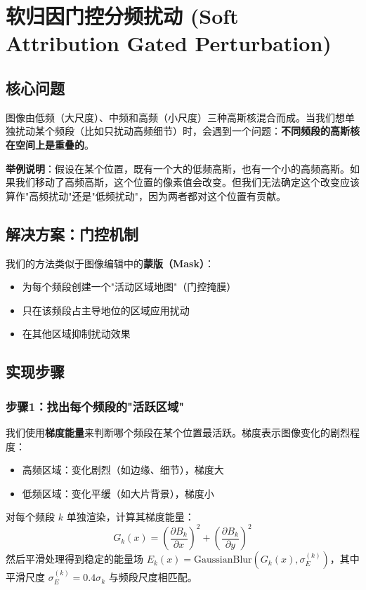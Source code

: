\documentclass{article}
\begin{document}
\section{软归因门控分频扰动 (Soft Attribution Gated Perturbation)}

\subsection{核心问题}
图像由低频（大尺度）、中频和高频（小尺度）三种高斯核混合而成。当我们想单独扰动某个频段（比如只扰动高频细节）时，会遇到一个问题：\textbf{不同频段的高斯核在空间上是重叠的}。

\textbf{举例说明}：假设在某个位置，既有一个大的低频高斯，也有一个小的高频高斯。如果我们移动了高频高斯，这个位置的像素值会改变。但我们无法确定这个改变应该算作"高频扰动"还是"低频扰动"，因为两者都对这个位置有贡献。

\subsection{解决方案：门控机制}
我们的方法类似于图像编辑中的\textbf{蒙版（Mask）}：
\begin{itemize}
    \item 为每个频段创建一个"活动区域地图"（门控掩膜）
    \item 只在该频段占主导地位的区域应用扰动
    \item 在其他区域抑制扰动效果
\end{itemize}

\subsection{实现步骤}

\subsubsection{步骤1：找出每个频段的"活跃区域"}
我们使用\textbf{梯度能量}来判断哪个频段在某个位置最活跃。梯度表示图像变化的剧烈程度：
\begin{itemize}
    \item 高频区域：变化剧烈（如边缘、细节），梯度大
    \item 低频区域：变化平缓（如大片背景），梯度小
\end{itemize}

对每个频段 $k$ 单独渲染，计算其梯度能量：
\begin{equation}
G_k(x) = \left(\frac{\partial B_k}{\partial x}\right)^2 + \left(\frac{\partial B_k}{\partial y}\right)^2
\end{equation}
然后平滑处理得到稳定的能量场 $E_k(x) = \text{GaussianBlur}(G_k(x), \sigma_E^{(k)})$，其中平滑尺度 $\sigma_E^{(k)} = 0.4 \sigma_k$ 与频段尺度相匹配。
\end{document}
